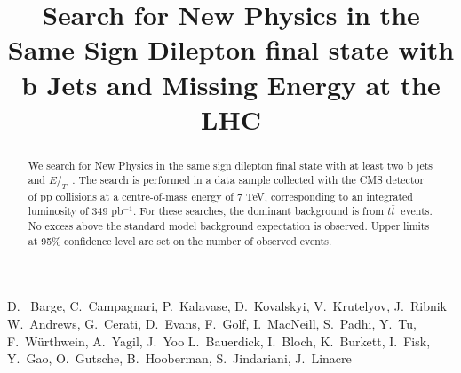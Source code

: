 \documentclass{cmspaper}
\newcommand{\met} {\ensuremath{E\!\!\!\!/_T}}
\newcommand{\ttbar} {\ensuremath{t\bar{t}~}}
\begin{document}
%
\begin{titlepage}
\title{Search for New Physics in the Same Sign Dilepton final state with b Jets and Missing Energy at the LHC}

  \begin{Authlist}
    D.~ Barge, C.~Campagnari, P.~Kalavase, D.~Kovalskyi, V.~Krutelyov, J.~Ribnik
    W.~Andrews, G.~Cerati, D.~Evans, F.~Golf, I.~MacNeill, S.~Padhi, Y.~Tu, F.~W\"urthwein, A.~Yagil, J.~Yoo
    L.~Bauerdick, I.~Bloch, K.~Burkett, I.~Fisk, Y.~Gao, O.~Gutsche, B.~Hooberman, S.~Jindariani, J.~Linacre
  \end{Authlist}

\begin{abstract}
We search for New Physics in the same sign dilepton final state with at least two b jets 
and \met~. The search is performed in a data sample collected with the CMS detector
of pp collisions at a centre-of-mass energy of 7 TeV, corresponding to an integrated
luminosity of $349$ pb$^{-1}$. For these searches, the dominant background is from \ttbar 
events. No excess above the standard model background expectation is observed.
Upper limits at 95\% confidence level are set on the number of observed events.
\end{abstract}
\end{titlepage}


%






\clearpage

\end{document}
